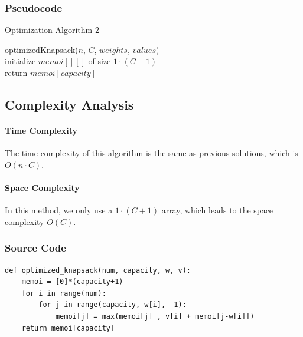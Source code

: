 \documentclass{article}
\begin{document}
\subsubsection{Pseudocode}
\begin{algorithm}[H]
\caption{Optimization Algorithm 2}
\SetAlgoLined
{}
optimizedKnapsack($n$, $C$, $weights$, $values$) \\
initialize $memoi[][]$ of size $1 \cdot (C+1)$\; \\
\For{$i \in [0,n-1]$}{
    \For{$j \in [capacity, weights[i]$}{
        $memoi[j]$ = max($memoi[j] , values[i] + memoi[j-weights[i]]$) \; \\
        $j--$ \; \\
        }
    $i++$ \; \\
    }
    return $memoi[capacity]$ \;
\end{algorithm}

\subsection{Complexity Analysis}
\paragraph{Time Complexity} The time complexity of this algorithm is the same as previous solutions, which is $O(n\cdot C)$. 
\paragraph{Space Complexity} In this method, we only use a $1 \cdot (C+1)$ array, which leads to the space complexity $O(C)$.

\subsubsection{Source Code}
\begin{lstlisting}[breaklines=true]
def optimized_knapsack(num, capacity, w, v):  
    memoi = [0]*(capacity+1)   
    for i in range(num): 
        for j in range(capacity, w[i], -1): 
            memoi[j] = max(memoi[j] , v[i] + memoi[j-w[i]])
    return memoi[capacity]
\end{lstlisting}
\end{document}
